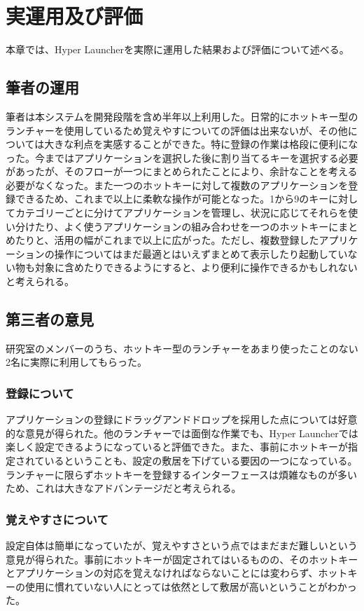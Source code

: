 \chapter{実運用及び評価}
本章では、Hyper Launcherを実際に運用した結果および評価について述べる。

\newpage

\section{筆者の運用}
筆者は本システムを開発段階を含め半年以上利用した。日常的にホットキー型のランチャーを使用しているため覚えやすについての評価は出来ないが、その他については大きな利点を実感することができた。特に登録の作業は格段に便利になった。今まではアプリケーションを選択した後に割り当てるキーを選択する必要があったが、そのフローが一つにまとめられたことにより、余計なことを考える必要がなくなった。また一つのホットキーに対して複数のアプリケーションを登録できるため、これまで以上に柔軟な操作が可能となった。1から9のキーに対してカテゴリーごとに分けてアプリケーションを管理し、状況に応じてそれらを使い分けたり、よく使うアプリケーションの組み合わせを一つのホットキーにまとめたりと、活用の幅がこれまで以上に広がった。ただし、複数登録したアプリケーションの操作についてはまだ最適とはいえずまとめて表示したり起動していない物も対象に含めたりできるようにすると、より便利に操作できるかもしれないと考えられる。

\section{第三者の意見}
研究室のメンバーのうち、ホットキー型のランチャーをあまり使ったことのない2名に実際に利用してもらった。

\subsection{登録について}
アプリケーションの登録にドラッグアンドドロップを採用した点については好意的な意見が得られた。他のランチャーでは面倒な作業でも、Hyper Launcherでは楽しく設定できるようになっていると評価できた。また、事前にホットキーが指定されているということも、設定の敷居を下げている要因の一つになっている。ランチャーに限らずホットキーを登録するインターフェースは煩雑なものが多いため、これは大きなアドバンテージだと考えられる。

\subsection{覚えやすさについて}
設定自体は簡単になっていたが、覚えやすさという点ではまだまだ難しいという意見が得られた。事前にホットキーが固定されてはいるものの、そのホットキーとアプリケーションの対応を覚えなければならないことには変わらず、ホットキーの使用に慣れていない人にとっては依然として敷居が高いということがわかった。

